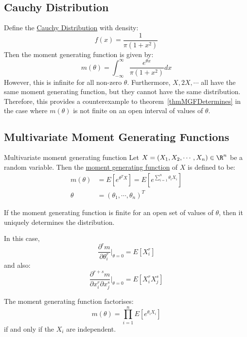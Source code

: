 \documentclass[../Main.tex]{subfiles}
\begin{document}
\subsection{Cauchy Distribution}
Define the \underline{Cauchy Distribution} with density:
\begin{equation*}
    f(x) = \frac{1}{\pi (1 + x^2)}
\end{equation*}
Then the moment generating function is given by:
\begin{equation*}
    m(\theta) = \int_{-\infty}^\infty \frac{e^{\theta x}}{\pi(1 + x^2)}dx
\end{equation*}
However, this is infinite for all non-zero $\theta$. Furthermore, $X, 2X, \cdots$ all have the same moment generating function, but they cannot have the same distribution. Therefore, this provides a counterexample to theorem~\ref{thmMGFDetermines} in the case where $m(\theta)$ is not finite on an open interval of values of $\theta$.
\subsection{Multivariate Moment Generating Functions}
\begin{definition}{Multivariate moment generating function}
    Let $X = (X_1, X_2, \cdots, X_n) \in \R^n$ be a random variable. Then the \underline{moment generating function} of $X$ is defined to be:
    \begin{align*}
        m(\theta) &= E[e^{\theta^T X}] = E[e^{\sum_{i=1}^n \theta_i X_i}] \\
        \theta &= (\theta_1, \cdots, \theta_n)^T
    \end{align*}
\end{definition}
\begin{theorem}
    If the moment generating function is finite for an open set of values of $\theta$, then it uniquely determines the distribution.

    In this case,
    \begin{equation*}
        \frac{\partial^r m}{\partial \theta_i^r} \vert_{\theta = 0} = E[X_i^r]
    \end{equation*}
    and also:
    \begin{equation*}
        \frac{\partial^{r + s}m}{\partial x_i^r \partial x_j^s} \vert_{\theta = 0} = E[X_i^r X_j^s]
    \end{equation*}
    \label{thmMGFMultiVarDetermines}
\end{theorem}
\begin{proposition}
    The moment generating function factorises:
    \begin{equation*}
        m(\theta) = \prod_{i = 1}^n E[e^{\theta_i X_i}]
    \end{equation*}
    if and only if the $X_i$ are independent.
    \label{propMGFMultiVarFactorise}
\end{proposition}
\end{document}

